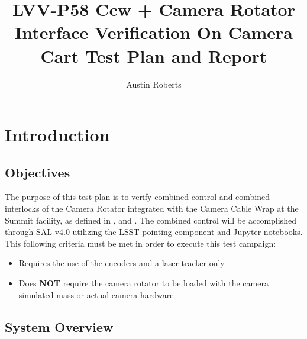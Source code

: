 \documentclass[SE,lsstdraft,STR,toc]{lsstdoc}
\providecommand{\tightlist}{
  \setlength{\itemsep}{0pt}\setlength{\parskip}{0pt}}
\begin{document}
\def\milestoneName{Ccw + Camera Rotator Interface Verification On Camera Cart}
\def\milestoneId{LVV-P58}
\def\product{SIT-COM Integration}


\title{ LVV-P58 Ccw + Camera Rotator Interface Verification On Camera Cart Test Plan and Report}
\setDocRef{\lsstDocType-\lsstDocNum}
\date{\vcsdate}
\author{ Austin Roberts }






\maketitle

\section{Introduction}
\label{sect:intro}


\subsection{Objectives}
\label{sect:objectives}

 The purpose of this test plan is to verify combined control and combined
interlocks of the Camera Rotator integrated with the Camera Cable Wrap
at the Summit facility, as defined in ,  and . The
combined control will be accomplished through SAL v4.0 utilizing the
LSST pointing component and Jupyter notebooks. This following criteria
must be met in order to execute this test campaign:

\begin{itemize}
\tightlist
\item
  Requires the use of the encoders and a laser tracker only
\item
  Does \textbf{NOT} require the camera rotator to be loaded with the
  camera simulated mass or actual camera hardware
\end{itemize}



\subsection{System Overview}
\label{sect:systemoverview}
\end{document}
